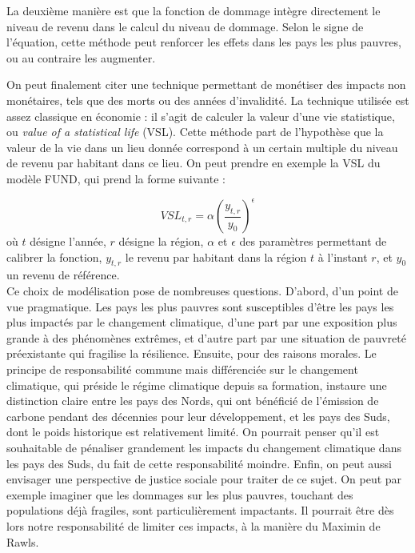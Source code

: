 La deuxième manière est que la fonction de dommage intègre directement le niveau de revenu dans le calcul du niveau de dommage. Selon le signe de l'équation, cette méthode peut renforcer les effets dans les pays les plus pauvres, ou au contraire les augmenter. 

On peut finalement citer une technique permettant de monétiser des impacts non monétaires, tels que des morts ou des années d'invalidité. La technique utilisée est assez classique en économie : il s'agit de calculer la valeur d'une vie statistique, ou \emph{value of a statistical life} (VSL). Cette méthode part de l'hypothèse que la valeur de la vie dans un lieu donnée correspond à un certain multiple du niveau de revenu par habitant dans ce lieu. On peut prendre en exemple la VSL du modèle FUND, qui prend la forme suivante : 

\begin{equation}
    VSL_{t, r} = \alpha (\frac{y_{t,r}}{y_0})^\epsilon
\end{equation}
où $t$ désigne l'année, $r$ désigne la région, $\alpha$ et $\epsilon$ des paramètres permettant de calibrer la fonction, $y_{t,r}$ le revenu par habitant dans la région $t$ à l'instant $r$, et $y_0$ un revenu de référence.  \\

Ce choix de modélisation pose de nombreuses questions. 
D'abord, d'un point de vue pragmatique. Les pays les plus pauvres sont susceptibles d'être les pays les plus impactés par le changement climatique, d'une part par une exposition plus grande à des phénomènes extrêmes, et d'autre part par une situation de pauvreté préexistante qui fragilise la résilience. 
Ensuite, pour des raisons morales. Le principe de responsabilité commune mais différenciée sur le changement climatique, qui préside le régime climatique depuis sa formation, instaure une distinction claire entre les pays des Nords, qui ont bénéficié de l'émission de carbone pendant des décennies pour leur développement, et les pays des Suds, dont le poids historique est relativement limité. On pourrait penser qu'il est souhaitable de pénaliser grandement les impacts du changement climatique dans les pays des Suds, du fait de cette responsabilité moindre. 
Enfin,  on peut aussi envisager une perspective de justice sociale pour traiter de ce sujet. On peut par exemple imaginer que les dommages sur les plus pauvres, touchant des populations déjà fragiles, sont particulièrement impactants. Il pourrait être dès lors notre responsabilité de limiter ces impacts, à la manière du Maximin de Rawls. 

